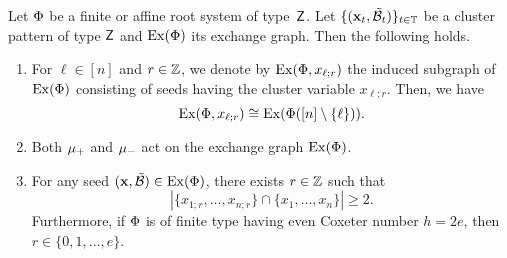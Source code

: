 \begin{proposition}
    \label{prop_FZ_finite_type_Coxeter_element}
Let $\Phi$ be a finite or affine root system of type~$\mathsf{Z}$. 
Let $\{(\mathbf x_t, \mathcal{\tilde{B}}_t)\}_{t\in \mathbb T}$ be a cluster pattern of type $\mathsf{Z}$ and $\operatorname{Ex}(\Phi)$ its exchange graph.
Then the following holds.
\begin{enumerate} 
\item For $\ell \in [n]$ and $r \in \mathbb{Z}$, we denote by $\operatorname{Ex}({\Phi},{x_{\ell;r}})$ the induced subgraph  of $\operatorname{Ex}(\Phi)$ consisting of seeds having the cluster variable $x_{\ell;r}$. Then, we have
\[
\operatorname{Ex}({\Phi},{x_{\ell;r}}) \cong \operatorname{Ex}(\Phi([n] \setminus \{\ell\})).
\]
\item Both $\mu_+$ and $\mu_-$ act on the exchange graph $\operatorname{Ex}(\Phi)$.
\item For any seed $(\mathbf{x}, \mathcal{\tilde{B}}) \in \operatorname{Ex}(\Phi)$, there exists $r\in \mathbb{Z}$ such that 
\[
|\{ x_{1;r},\dots,x_{n;r}\} \cap \{ x_{1},\dots,x_{n}  \}| \geq 2.
\]
Furthermore, if $\Phi$ is of finite type having even Coxeter number $h = 2e$, then $r \in \{0,1,\dots,e\}$.
\end{enumerate}
\end{proposition}

